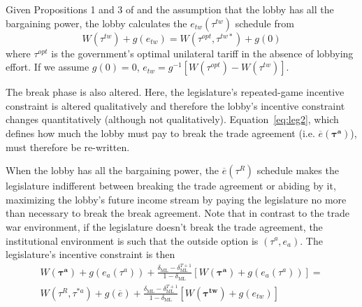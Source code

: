 \documentclass[authoryear, review]{elsarticle}
\newcommand{\ov}{\overline}
\newcommand{\bta}{\bm{\tau^a}}
\newcommand{\btw}{\bm{\tau^{tw}}}
\newcommand{\de}{\delta}
\begin{document}
Given Propositions 1 and 3 of \citet{dgh97} and the assumption that the lobby has all the bargaining power, the lobby calculates the $e_{tw}\left(\tau^{tw}\right)$ schedule from 
\begin{equation}
  W(\tau^{tw}) +g(e_{tw}) = W(\tau^{opt},\tau^{tw*}) +g(0)
	\label{eq:dgh}
\end{equation}
where $\tau^{opt}$ is the government's optimal unilateral tariff in the absence of lobbying effort. If we assume $g(0) = 0$, $e_{tw} = g^{-1}\left[W(\tau^{opt}) - W(\tau^{tw})\right]$.
								
The break phase is also altered. Here, the legislature's repeated-game incentive constraint is altered qualitatively and therefore the lobby's incentive constraint changes quantitatively (although not qualitatively). Equation~\ref{eq:leg2}, which defines how much the lobby must pay to break the trade agreement (i.e. $\ov{e}(\bta)$), must therefore be re-written.

When the lobby has all the bargaining power, the $\ov{e}(\tau^R)$ schedule makes the legislature indifferent between breaking the trade agreement or abiding by it, maximizing the lobby's future income stream by paying the legislature no more than necessary to break the break agreement. Note that in contrast to the trade war environment, if the legislature doesn't break the trade agreement, the institutional environment is such that the outside option is $\left(\tau^a,e_a\right)$. The legislature's incentive constraint is then
	\begin{multline}
		W(\bta) + g(e_a(\tau^a)) + \frac{\de_\text{ML} - \de_\text{ML}^{T+1}}{1-\de_\text{ML}}\left[W(\bta) + g(e_a(\tau^a))\right] = \\
	W(\tau^R,\tau^{*a}) +g(\ov{e}) + \frac{\de_\text{ML} - \de_\text{ML}^{T+1}}{1-\de_\text{ML}} \left[W(\btw) + g(e_{tw})\right]
		\label{eq:newleg}
	\end{multline}
					
\end{document}
